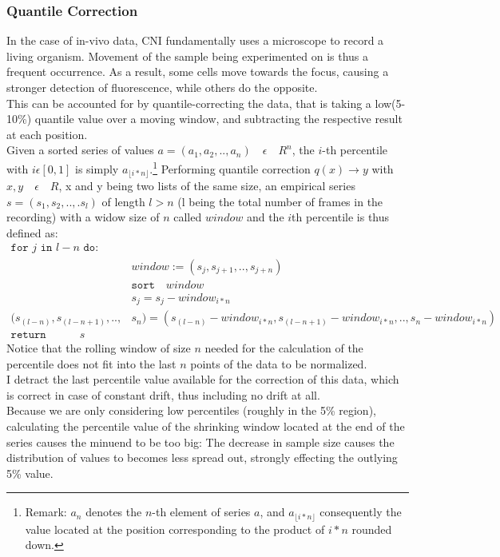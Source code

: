 \documentclass[titlepage]{article}
\begin{document}
\subsubsection{Quantile Correction} \label{quant}
In the case of in-vivo data, CNI fundamentally uses a microscope to record a living organism. Movement of the sample being experimented on is thus a frequent occurrence.
As a result, some cells move towards the focus, causing a stronger detection of fluorescence, while others do the opposite.\\
This can be accounted for by quantile-correcting the data, that is taking a low(5-10\%) quantile value over a moving window, and subtracting the respective result at each position.\cite{dombeck_imaging_2007}\\
Given a sorted series of values $a = (a_1,a_2,..,a_n)\quad \epsilon\quad R^n$, the $i$-th percentile with $i \epsilon [0,1]$ is simply $a_{ \lfloor i*n \rfloor}$.\footnote{Remark: $a_n$ denotes the $n$-th element of series $a$, and $a_{ \lfloor i*n \rfloor}$ consequently the value located at the position corresponding to the product of $i*n$ rounded down.}
Performing quantile correction $q(x)\rightarrow y$ with $x,y \quad \epsilon  \quad R$, x and y being two lists of the same size, an empirical series $s = (s_1,s_2,..,.s_l)$ of length $l>n$ (l being the total number of frames in the recording) with a widow size of $n$ called $window$ and the $i$th percentile is thus defined as:\\
\begin{align*}
\texttt{for $j$ in $l-n$ do:} &\\
& window:= (s_j,s_{j+1},..,s_{j+n})\\
& \texttt{sort} \quad window\\
& s_j = s_j - window_{i*n} \\
(s_{(l-n)},s_{(l-n+1)},..,& s_n) = (s_{(l-n)}- window_{i*n},s_{(l-n+1)}- window_{i*n},..,s_n- window_{i*n}) \\
\texttt{return}\quad \qquad s\qquad &
\end{align*}
Notice that the rolling window of size $n$ needed for the calculation of the percentile does not fit into the last $n$ points of the data to be normalized.\\
I detract the last percentile value available for the correction of this data, which is correct in case of constant drift, thus including no drift at all.\\
Because we are only considering low percentiles (roughly in the 5\% region), calculating the percentile value of the shrinking window located at the end of the series causes the minuend to be too big: The decrease in sample size causes the distribution of values to becomes less spread out, strongly effecting the outlying 5\% value.\\
\end{document}
